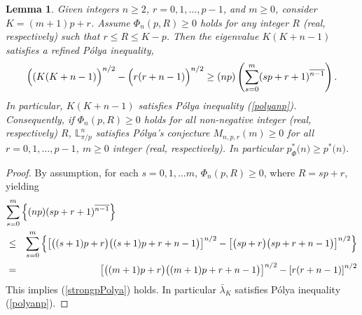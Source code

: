 \documentclass[11pt,a4paper,times]{amsart}
\theoremstyle{plain}
\newtheorem{lemma}[thm]{Lemma}
\theoremstyle{definition}
\numberwithin{equation}{section}
\newcommand{\eqskip}{ \vspace*{2mm}\\ }
\newcommand{\pin}[1]{p^*{#1}}
\newcommand{\piphi}[1]{p^*_{\Phi}{#1}}
\newcommand{\lune}[2]{\mathbb{L}^{#1}_{#2}}
\newcommand{\txtg}{\textcolor{green}}
\begin{document}
{%
 \begin{lemma}  \label{REDUCE}
Given integers $n\geq 2$,  $r=0,1,\ldots, p-1$, and $m\geq 0$,  consider $K=(m+1)p+r$. Assume 
  $\Phi_n(p,R)\geq 0$ holds for any integer $R$ (real, respectively) such that $r\leq R\leq K-p$. Then {the eigenvalue $K(K+n-1)$} satisfies a refined P\'{o}lya inequality, 
\begin{equation}\label{strongpPolya}
\Big{(}(K(K+n-1)\Big{)}^{n/2}-
 \Big{(}r(r+n-1)\Big{)}^{n/2}\geq  (np)\left(\sum_{s=0}^m(sp+r+1)^{\overline{n-1}}\right).
 \end{equation}
 In particular, $K(K+n-1)$ satisfies P\'{o}lya inequality (\ref{polyanp}). Consequently, if $\Phi_n(p,R)\geq 0$ holds for all {non-negative integer (real, respectively) $R$},  $\lune{n}{\pi/p}$ satisfies P\'{o}lya's conjecture
 $M_{n,p,r}(m)\geq 0$ for all $r=0,1,\ldots, p-1$,
 $m\geq 0$ integer (real, respectively).
  In particular  $\piphi(n)\geq \pin(n)$.
 \end{lemma}
\begin{proof}
By assumption, for each $s=0,1, \ldots m$, $\Phi_n(p,R)\geq 0$,  where $R=sp+r$, yielding
\begin{eqnarray*}
\lefteqn{\sum_{s=0}^{m}\left\{(np)(sp+r+1)^{\overline{n-1}}\right\}}\eqskip
&\leq&
\sum_{s=0}^m\left\{\left[ \big{(}(s+1)p+r\big{)}\big{(}
(s+1)p+r+n-1\big{)}\right]^{n/2}-\left[\big{(}sp+r\big{)}\big{(}sp+r+n-1\big{)}\right]^{n/2}\right\}\eqskip
&=&\left[\big{(}(m+1)p+r\big{)}\big{(}(m+1)p+r+n-1\big{)}\right]^{n/2}-\left[r(r+n-1)\right]^{n/2}
\end{eqnarray*}
This implies 
(\ref{strongpPolya}) holds. In particular $\bar{\lambda}_K$  satisfies P\'{o}lya inequality (\ref{polyanp}).
\end{proof}

}
\end{document}
